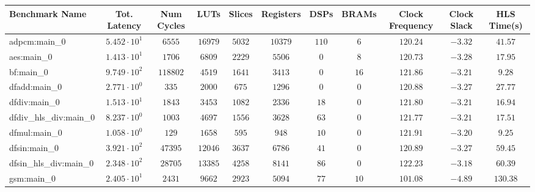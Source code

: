 \begin{tabular}{|l|c|c|c|c|c|c|c|c|c|c|}
\hline
Benchmark Name          & Tot. Latency           & Num Cycles & LUTs       & Slices    & Registers & DSPs    & BRAMs   & Clock Frequency & Clock Slack & HLS Time(s) \\
\hline
adpcm:main\_0           & $ 5.452 \cdot 10^{1} $ & $ 6555   $ & $ 16979  $ & $ 5032  $ & $ 10379 $ & $ 110 $ & $ 6   $ & $ 120.24      $ & $ -3.32   $ & $ 41.57   $ \\
aes:main\_0             & $ 1.413 \cdot 10^{1} $ & $ 1706   $ & $ 6809   $ & $ 2229  $ & $ 5506  $ & $ 0   $ & $ 8   $ & $ 120.73      $ & $ -3.28   $ & $ 17.95   $ \\
bf:main\_0              & $ 9.749 \cdot 10^{2} $ & $ 118802 $ & $ 4519   $ & $ 1641  $ & $ 3413  $ & $ 0   $ & $ 16  $ & $ 121.86      $ & $ -3.21   $ & $ 9.28    $ \\
dfadd:main\_0           & $ 2.771 \cdot 10^{0} $ & $ 335    $ & $ 2000   $ & $ 675   $ & $ 1296  $ & $ 0   $ & $ 0   $ & $ 120.88      $ & $ -3.27   $ & $ 27.77   $ \\
dfdiv:main\_0           & $ 1.513 \cdot 10^{1} $ & $ 1843   $ & $ 3453   $ & $ 1082  $ & $ 2336  $ & $ 18  $ & $ 0   $ & $ 121.80      $ & $ -3.21   $ & $ 16.94   $ \\
dfdiv\_hls\_div:main\_0 & $ 8.237 \cdot 10^{0} $ & $ 1003   $ & $ 4697   $ & $ 1556  $ & $ 3628  $ & $ 63  $ & $ 0   $ & $ 121.77      $ & $ -3.21   $ & $ 17.51   $ \\
dfmul:main\_0           & $ 1.058 \cdot 10^{0} $ & $ 129    $ & $ 1658   $ & $ 595   $ & $ 948   $ & $ 10  $ & $ 0   $ & $ 121.91      $ & $ -3.20   $ & $ 9.25    $ \\
dfsin:main\_0           & $ 3.921 \cdot 10^{2} $ & $ 47395  $ & $ 12046  $ & $ 3637  $ & $ 6786  $ & $ 41  $ & $ 0   $ & $ 120.89      $ & $ -3.27   $ & $ 59.45   $ \\
dfsin\_hls\_div:main\_0 & $ 2.348 \cdot 10^{2} $ & $ 28705  $ & $ 13385  $ & $ 4258  $ & $ 8141  $ & $ 86  $ & $ 0   $ & $ 122.23      $ & $ -3.18   $ & $ 60.39   $ \\
gsm:main\_0             & $ 2.405 \cdot 10^{1} $ & $ 2431   $ & $ 9662   $ & $ 2923  $ & $ 5094  $ & $ 77  $ & $ 10  $ & $ 101.08      $ & $ -4.89   $ & $ 130.38  $ \\

\end{tabular}
